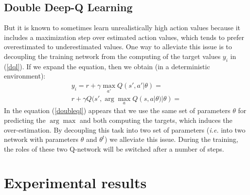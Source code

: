 \documentclass{article}
\begin{document}
\subsection{Double Deep-Q Learning \cite{doubledqn}}
But it is known to sometimes learn unrealistically high action values because it includes a maximization step over estimated action values, which tends to prefer overestimated to underestimated values. One way to alleviate this issue is to decoupling the training network from the computing of the target values $y_i$ in (\ref{dql}). If we expand the equation, then we obtain (in a deterministic environment):
\begin{equation}
\label{doubleql}
\begin{aligned}
		y_i =  r + \gamma \max_{a'} Q(s', a'|\theta) = \\
		r + \gamma Q(s', \arg \max_a Q(s, a|\theta)  |\theta) =
\end{aligned}
\end{equation}
In the equation (\ref{doubleql}) appears that we use the same set of parameters $\theta$ for predicting the $\arg \max$ and both computing the targets, which induces the over-estimation. By decoupling this task into two set of parameters (\textit{i.e.} into two network with parameters $\theta$ and $\theta^t $) we alleviate this issue. During the training, the roles of these two Q-network will be switched after a number of steps. 
\section{Experimental results}
\end{document}
